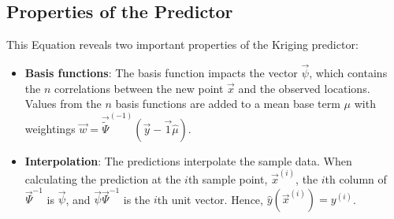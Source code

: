 \documentclass[
  letterpaper,
  DIV=11,
  numbers=noendperiod]{scrreprt}
\providecommand{\tightlist}{%
  \setlength{\itemsep}{0pt}\setlength{\parskip}{0pt}}\usepackage{longtable,booktabs,array}
\begin{document}
\hypertarget{properties-of-the-predictor}{%
\subsection{Properties of the
Predictor}\label{properties-of-the-predictor}}

This Equation reveals two important properties of the Kriging predictor:

\begin{itemize}
\tightlist
\item
  \textbf{Basis functions}: The basis function impacts the vector
  \(\vec{\psi}\), which contains the \(n\) correlations between the new
  point \(\vec{x}\) and the observed locations. Values from the \(n\)
  basis functions are added to a mean base term \(\mu\) with weightings
  \(\vec{w} = \vec{\tilde{\Psi}}^{(-1)} (\vec{y} - \vec{1}\hat{\mu})\).
\item
  \textbf{Interpolation}: The predictions interpolate the sample data.
  When calculating the prediction at the \(i\)th sample point,
  \(\vec{x}^{(i)}\), the \(i\)th column of \(\vec{\Psi}^{-1}\) is
  \(\vec{\psi}\), and \(\vec{\psi} \vec{\Psi}^{-1}\) is the \(i\)th unit
  vector. Hence, \(\hat{y}(\vec{x}^{(i)}) = y^{(i)}\).
\end{itemize}
\end{document}
